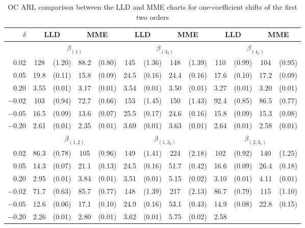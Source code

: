 \begin{table}[ht]
\tabcolsep 4.5pt \vspace{-0.3cm} \centering \caption{OC ARL comparison between the
LLD and MME charts for one-coefficient shifts of the first two orders}
\vspace{0.3cm}
\renewcommand{\arraystretch}{1.20}
\begin{tabular}{r|cccc|cccc|cccc}\hline
$\delta$ & \multicolumn{2}{c}{LLD} & \multicolumn{2}{c|}{MME} &
\multicolumn{2}{c}{LLD} & \multicolumn{2}{c|}{MME} & \multicolumn{2}{c}{LLD} &
\multicolumn{2}{c}{MME}
\\\hline
& \multicolumn{4}{c|}{$\beta_{(1)}$} & \multicolumn{4}{c|}{$\beta_{(3_2)}$} &
\multicolumn{4}{c}{$\beta_{(4_1)}$}
\\\hline
0.02 & 128 & (1.20) & 88.2 & (0.80) & 145 & (1.36) & 148 & (1.39) & 110 & (0.99) &
104 & (0.95)
\\
0.05 & 19.8 & (0.11) & 15.8 & (0.09) & 24.5 & (0.16) & 24.4 & (0.16) & 17.6 & (0.10)
& 17.2 & (0.09)
\\
0.20 & 3.55 & (0.01) & 3.17 & (0.01) & 3.54 & (0.01) & 3.50 & (0.01) & 3.27 & (0.01)
& 3.20 & (0.01)
\\
$-0.02$ & 103 & (0.94) & 72.7 & (0.66) & 153 & (1.45) & 150 & (1.43) & 92.4 & (0.85)
& 86.5 & (0.77)
\\
$-0.05$ & 16.5 & (0.09) & 13.6 & (0.07) & 25.5 & (0.17) & 24.6 & (0.16) & 15.8 &
(0.09) & 15.3 & (0.08)
\\
$-0.20$ & 2.61 & (0.01) & 2.35 & (0.01) & 3.69 & (0.01) & 3.63 & (0.01) & 2.64 &
(0.01) & 2.58 & (0.01)
\\\hline
& \multicolumn{4}{c|}{$\beta_{(1,2)}$} & \multicolumn{4}{c|}{$\beta_{(1,3_2)}$} &
\multicolumn{4}{c}{$\beta_{(2,3_1)}$}
\\\hline
0.02 & 86.3 & (0.78) & 105 & (0.96) & 149 & (1.41) & 224 & (2.18) & 102 & (0.92) &
140 & (1.25)
\\
0.05 & 14.3 & (0.07) & 21.1 & (0.13) & 24.5 & (0.16) & 51.7 & (0.42) & 16.6 & (0.09)
& 26.4 & (0.18)
\\
0.20 & 2.95 & (0.01) & 3.84 & (0.01) & 3.51 & (0.01) & 5.15 & (0.02) & 3.10 & (0.01)
& 4.11 & (0.01)
\\
$-0.02$ & 71.7 & (0.63) & 85.7 & (0.77) & 148 & (1.39) & 217 & (2.13) & 86.7 &
(0.79) & 115 & (1.10)
\\
$-0.05$ & 12.6 & (0.06) & 17.1 & (0.10) & 24.9 & (0.16) & 53.1 & (0.43) & 14.9 &
(0.08) & 22.8 & (0.15)
\\
$-0.20$ & 2.26 & (0.01) & 2.80 & (0.01) & 3.62 & (0.01) & 5.75 & (0.02) & 2.58 &

\end{tabular}
\end{table}
